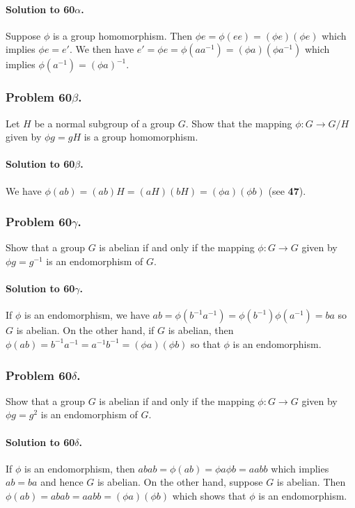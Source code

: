 \paragraph*{Solution to 60$\alpha$.}
Suppose $\phi$ is a group homomorphism. Then $\phi e = \phi (ee) = (\phi e) (\phi e)$
which implies $\phi e = e'$. We then have $e' = \phi e = \phi (aa^{-1}) =
(\phi a) (\phi a^{-1})$ which implies $\phi( a^{-1}) = (\phi a)^{-1}$.

\subsubsection{Problem 60$\beta$.}
Let $H$ be a normal subgroup of a group $G$. Show that the mapping $\phi : G
\rightarrow G/H$ given by $\phi g = gH$ is a group homomorphism.

\paragraph*{Solution to 60$\beta$.}
We have $\phi (ab) = (ab)H = (aH)(bH) = (\phi a)(\phi b)$ (see \textbf{47}).

\subsubsection{Problem 60$\gamma$.}
Show that a group $G$ is abelian if and only if the mapping $\phi : G \rightarrow
G$ given by $\phi g = g^{-1}$ is an endomorphism of $G$.

\paragraph*{Solution to 60$\gamma$.}
If $\phi$ is an endomorphism, we have $ab = \phi(b^{-1}a^{-1}) = \phi(b^{-1})\phi(a^{-1})
= ba$ so $G$ is abelian. On the other hand, if $G$ is abelian, then $\phi (ab)
= b^{-1}a^{-1} = a^{-1}b^{-1} = (\phi a)(\phi b)$ so that $\phi$ is an endomorphism.

\subsubsection{Problem 60$\delta$.}
Show that a group $G$ is abelian if and only if the mapping $\phi : G \rightarrow
G$ given by $\phi g = g^2$ is an endomorphism of $G$.

\paragraph*{Solution to 60$\delta$.}
If $\phi$ is an endomorphism, then $abab = \phi(ab) = \phi a \phi b = aabb$ which
implies $ab = ba$ and hence $G$ is abelian. On the other hand, suppose $G$ is
abelian. Then $\phi (ab) = abab = aabb = (\phi a)(\phi b)$ which shows that $\phi$
is an endomorphism.

